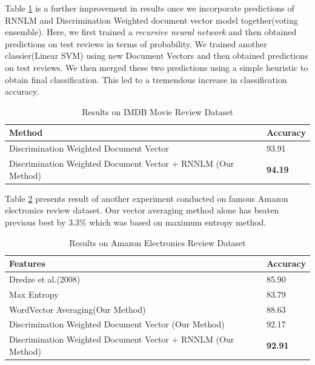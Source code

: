 \documentclass[11pt,a4paper]{article}
\begin{document}
Table \ref{table:IMDB_rnnlm} is a further improvement in results once we incorporate predictions of RNNLM and Discrimination Weighted document vector model together(voting ensemble). Here, we first trained a \emph{recursive neural network} and then obtained predictions on test reviews in terms of probability. We trained another classier(Linear SVM) using new Document Vectors and then obtained predictions on test reviews. We then merged these two predictions using a simple heuristic to obtain final classification. This led to a tremendous increase in classification accuracy.

\begin {table}[H]
\centering
\small
\begin{tabular}{ | p{5.5cm} | p{1.2cm} | }
\hline
\textbf{Method} & \textbf{Accuracy} \\ \hline
Discrimination Weighted Document Vector & 93.91\\ \hline
Discrimination Weighted Document Vector + RNNLM (Our Method) & \textbf{94.19}\\ \hline
\end{tabular}
\caption {Results on IMDB Movie Review Dataset}
\label{table:IMDB_rnnlm}
\end{table}

Table \ref{table:amazon} presents result of another experiment conducted on famous Amazon electronics review dataset. Our vector averaging method alone has beaten previous best by 3.3\% which was based on maximum entropy method.
\begin {table}[H]
\centering
\small
\begin{tabular}{ | p{5.5cm} | p{1.2cm} | }
\hline
\textbf{Features} & \textbf{Accuracy} \\ \hline
Dredze et al.(2008) & 85.90\\ \hline
Max Entropy & 83.79\\ \hline
WordVector Averaging(Our Method) & 88.63\\ \hline
Discrimination Weighted Document Vector (Our Method) & 92.17\\ \hline
Discrimination Weighted Document Vector + RNNLM (Our Method) & \textbf{92.91}\\ \hline
\end{tabular}
\caption {Results on Amazon Electronics Review Dataset}
\label{table:amazon}
\end{table}
\end{document}
